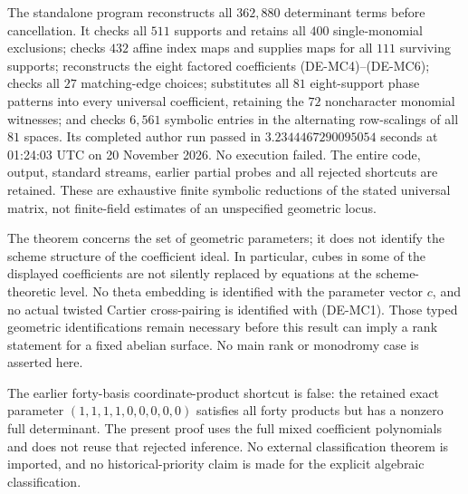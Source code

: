 \begin{remark}
\label{rem:DE-Moore-classification-scope}
The standalone program
reconstructs all \(362{,}880\) determinant terms before cancellation.
It checks all \(511\) supports and retains all \(400\) single-monomial
exclusions; checks \(432\) affine index maps and supplies maps for
all \(111\) surviving supports; reconstructs the eight factored
coefficients (DE-MC4)--(DE-MC6); checks all \(27\) matching-edge
choices; substitutes all \(81\) eight-support phase patterns into
every universal coefficient, retaining the \(72\) noncharacter
monomial witnesses; and checks \(6{,}561\) symbolic entries in the
alternating row-scalings of all \(81\) spaces.  Its completed author
run passed in \(3.2344467290095054\) seconds at
01:24:03 UTC on 20 November 2026.  No execution failed.
The entire code, output, standard streams, earlier partial probes
and all rejected shortcuts are retained.  These are exhaustive
finite symbolic reductions of the stated universal matrix,
not finite-field estimates of an unspecified geometric locus.

The theorem concerns the set of geometric parameters; it does not
identify the scheme structure of the coefficient ideal.  In
particular, cubes in some of the displayed coefficients are not
silently replaced by equations at the scheme-theoretic level.
No theta embedding is identified with the parameter vector \(c\),
and no actual twisted Cartier cross-pairing is identified with
(DE-MC1).  Those typed geometric identifications remain necessary
before this result can imply a rank statement for a fixed abelian
surface.  No main rank or monodromy case is asserted here.

The earlier forty-basis coordinate-product shortcut is false:
the retained exact parameter \((1,1,1,1,0,0,0,0,0)\) satisfies
all forty products but has a nonzero full determinant.  The
present proof uses the full mixed coefficient polynomials and
does not reuse that rejected inference.  No external
classification theorem is imported, and no historical-priority
claim is made for the explicit algebraic classification.
\end{remark}
